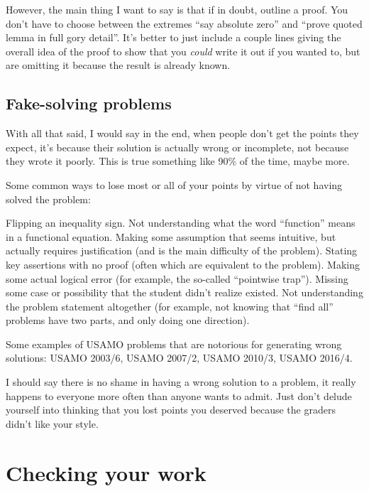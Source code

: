 \documentclass[11pt]{scrartcl}
\begin{document}
However, the main thing I want to say is that
\alert{if in doubt, outline a proof}.
You don't have to choose between the extremes
``say absolute zero'' and ``prove quoted lemma in full gory detail''.
It's better to just include a couple lines giving the overall idea of the proof
to show that you \emph{could} write it out if you wanted to,
but are omitting it because the result is already known.

\subsection{Fake-solving problems}
With all that said, I would say in the end,
when \alert{people don't get the points they expect,
it's because their solution is actually wrong or incomplete},
not because they wrote it poorly.
This is true something like 90\% of the time, maybe more.

Some common ways to lose most or all of your points
by virtue of not having solved the problem:
\begin{itemize}
  \ii Flipping an inequality sign.
  \ii Not understanding what the word ``function'' means
  in a functional equation.
  \ii Making some assumption that seems intuitive,
  but actually requires justification (and is the main difficulty of the problem).
  \ii Stating key assertions with no proof
  (often which are equivalent to the problem).
  \ii Making some actual logical error
  (for example, the so-called ``pointwise trap'').
  \ii Missing some case or possibility that the student didn't realize existed.
  \ii Not understanding the problem statement altogether
  (for example, not knowing that ``find all'' problems have two parts,
  and only doing one direction).
\end{itemize}
Some examples of USAMO problems that are notorious for generating wrong solutions:
USAMO 2003/6, USAMO 2007/2, USAMO 2010/3, USAMO 2016/4.

I should say there is no shame in having a wrong solution to a problem,
it really happens to everyone more often than anyone wants to admit.
Just don't delude yourself into thinking that you lost points
you deserved because the graders didn't like your style.

\section{Checking your work}
\end{document}
